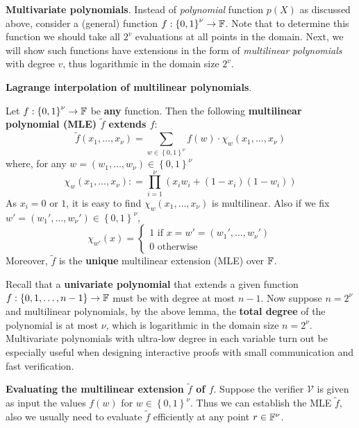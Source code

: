 \documentclass{article}
\begin{document}
\textbf{Multivariate polynomials}. Instead of \textit{polynomial} function $p(X)$ as discussed above, consider a (general) function $f: \left\{ 0, 1 \right\}^{\nu} \rightarrow \mathbb{F}$. Note that to determine this function we should take all $2^v$ evaluations at all points in the domain. Next, we will show such functions have extensions in the form of \textit{multilinear polynomials} with degree $v$, thus logarithmic in the domain size $2^v$. 

\textbf{Lagrange interpolation of multilinear polynomials}.

\begin{lemma} \label{lem:MLE}
Let $f: \left\{ 0, 1 \right\}^{\nu} \rightarrow \mathbb{F}$ be \textbf{any} function. Then the following \textbf{multilinear polynomial (MLE) $\tilde{f}$ extends $f$}:
\begin{equation*}
\tilde{f} (x_1, \dots, x_{\nu}) = \sum_{w \in \left\{ 0, 1 \right\}^{\nu}} f(w) \cdot \chi_{w}(x_1, \dots, x_{\nu})
\end{equation*}
where, for any $w = (w_1, \dots, w_{\nu}) \in \left\{ 0, 1 \right\}^{\nu} $
\begin{equation} \label{eq:MLE-basis}
\chi_{w}(x_1, \dots, x_{\nu}) : = \prod_{i = 1}^{\nu} (x_i w_i + (1 - x_i) (1 - w_i))
\end{equation}
As $x_i = 0$ or $1$, it is easy to find $\chi_w(x_1, \dots, x_{\nu})$ is multilinear. Also if we fix $w' = (w_1', \dots, w_{\nu}') \in \left\{ 0, 1 \right\}^{\nu}$, 
\[
\chi_{w'}(x) = \begin{cases}
1 \text{ if } x = w' = (w_1', \dots, w_{\nu}') \\
0 \text{ otherwise }
\end{cases}
\]
Moreover, $\tilde{f}$ is the \textbf{unique} multilinear extension (MLE) over $\mathbb{F}$.
\end{lemma}

Recall that a \textbf{univariate polynomial} that extends a given function $f: \left\{ 0, 1, \dots, n-1 \right\} \rightarrow \mathbb{F}$ must be with degree at most $n-1$. Now suppose $n = 2^{\nu}$ and multilinear polynomials, by the above lemma, the \textbf{total degree} of the polynomial is at most $\nu$, which is logarithmic in the domain size $n = 2^{\nu}$. Multivariate polynomials with ultra-low degree in each variable turn out be especially useful when designing interactive proofs with small communication and fast verification. 

\textbf{Evaluating the multilinear extension $\tilde{f}$ of $f$}. Suppose the verifier $\mathcal{V}$ is given as input the values $f(w)$ for $w \in \left\{ 0, 1 \right\}^{\nu}$. Thus we can establish the MLE $\tilde{f}$, also we usually need to evaluate $\tilde{f}$ efficiently at any point $r \in \mathbb{F}^{\nu}$. 
\end{document}
